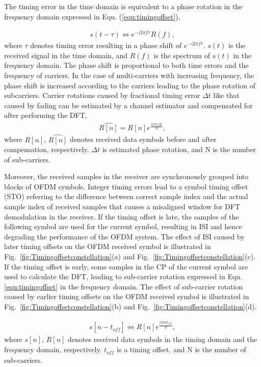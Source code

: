 The timing error in the time domain is equivalent to a phase rotation in the frequency domain expressed in Equ. (\ref{equ:timingoffset}),

\begin{eqnarray}
\label{equ:timingoffset}
               s (t - \tau )   \Leftrightarrow  e^{-i2\pi f\tau} R(f),
\end{eqnarray}	
where $\tau$ denotes timing error resulting in a phase shift of $e^{-i2\pi f\tau}$. 
$s(t)$ is the received signal in the time domain, and $R(f)$ is the spectrum of $s(t)$ in the frequency domain.
The phase shift is proportional to both time errors and the frequency of carriers.
In the case of multi-carriers with increasing frequency, the phase shift is increased according to the carriers leading to the phase rotation of subcarriers.
Carrier rotations caused by fractional timing error $\Delta t$ like that caused by fading can be estimated by a channel estimator and compensated for after performing the DFT,
\begin{eqnarray}
\label{equ:rotationcompensation}
               \widehat{R[n]} = R[n] e^{\frac{i2\pi n \Delta  t}{N}},
\end{eqnarray}
where $R[n]$, $\widehat{R[n]}$ denotes received data symbols before and after compensation, respectively. $\Delta t$ is estimated phase rotation, and N is the number of sub-carriers.

Moreover, the received samples in the receiver are synchronously grouped into blocks of OFDM symbols.
Integer timing errors lead to a symbol timing offset (STO) referring to the difference between correct sample index and the actual sample index of received samples that causes a misaligned window for DFT demodulation in the receiver.
If the timing offset is late, the samples of the following symbol are used for the current symbol, resulting in ISI and hence degrading the performance of the OFDM system. The effect of ISI caused by later timing offsets on the OFDM received symbol is illustrated in Fig.~\ref{fig:Timingoffsetconstellation}(a) and Fig.~\ref{fig:Timingoffsetconstellation}(c).
If the timing offset is early, some samples in the CP of the current symbol are used to calculate the DFT, leading to sub-carrier rotation expressed in Equ.\ref{equ:timingoffset} in the frequency domain.  
The effect of sub-carrier rotation caused by earlier timing offsets on the OFDM received symbol is illustrated in Fig.~\ref{fig:Timingoffsetconstellation}(b) and Fig.~\ref{fig:Timingoffsetconstellation}(d).

\begin{eqnarray}
\label{equ:rotationcompensation}
              s[n - \mathit{t_{off}}]  \Leftrightarrow R[n] e^{\frac{i2\pi n \mathit{t_{off}}}{N}},
\end{eqnarray}
where $s[n]$, $R[n]$ denotes received data symbols in the timing domain and the frequency domain, respectively. $\mathit{t_{off}}$ is a timing offset, and N is the number of sub-carriers.

